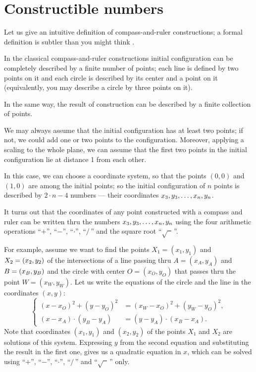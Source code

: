 %

\section{Constructible numbers}

Let us give an intuitive definition of compass-and-ruler constructions; a formal definition is subtler than you might think \cite{akopyan-fedorov}.

In the classical compass-and-ruler constructions initial configuration can be completely described by a finite number of points;
each line is defined by two points on it and each circle is described by its center and a point on it (equivalently, you may describe a circle by three points on it).

In the same way, the result of construction can be described by a finite collection of points.

We may always assume that the initial configuration has at least two points;
if not, we could add one or two points to the configuration.
Moreover, applying a scaling to the whole plane, we can assume that the first two points in the initial configuration lie at distance 1 from each other.

In this case, we can choose a  coordinate system, 
so that the points $(0,0)$ and $(1,0)$ are among the initial points;
so the initial configuration of $n$ points is described by 
$2\cdot n-4$ numbers --- their coordinates $x_3,y_3,\z\dots,x_n,y_n$. 

\medskip

It turns out that the coordinates of any point constructed with a compass and ruler
can be written thru the numbers $x_3,y_3,\z\dots,x_n,y_n$ using the four arithmetic operations ``$+$'', ``$-$'', ``$\cdot$'', ``$/\,$''
and the square root ``$\sqrt{\phantom{a}}\,$''.

For example, assume we want to find the points $X_1=(x_1,y_1)$ and $X_2\z=(x_2,y_2)$ of the intersections of 
a line passing thru $A=(x_A,y_A)$ and $B\z=(x_B,y_B)$ and
the circle with center $O=(x_O,y_O)$ that passes thru the point $W=(x_W,y_W)$.
Let us write the equations of the circle and the line in the coordinates $(x,y)$:
$$
\left\{
\begin{aligned}
(x-x_O)^2+(y-y_O)^2&=(x_W-x_O)^2+(y_W-y_O)^2,
\\
(x-x_A)\cdot(y_B-y_A)&=(y-y_A)\cdot(x_B-x_A).
\end{aligned}
\right.
$$
Note that coordinates $(x_1,y_1)$ and $(x_2,y_2)$ of the points $X_1$ and $X_2$ are solutions of this system.
Expressing $y$ from the second equation and substituting the result in the first one, gives us a quadratic equation in $x$, 
which can be solved using ``$+$'', ``$-$'', ``$\cdot$'', ``$/\,$''
and  ``$\sqrt{\phantom{a}}\,$'' only.


